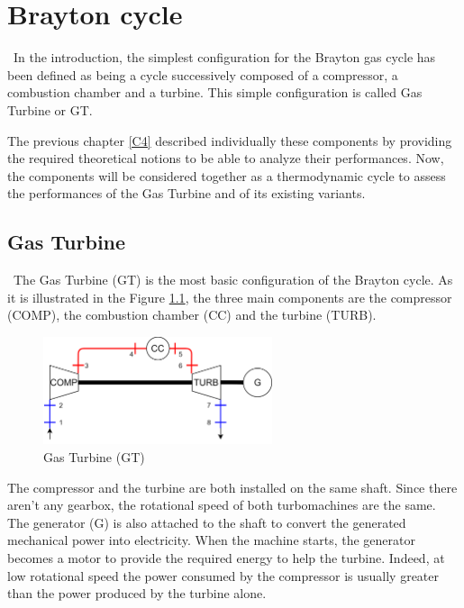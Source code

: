 \graphicspath{{Chapitre_5/Images/}}
\chapter{Brayton cycle}\label{C5}
\quad\, In the introduction, the simplest configuration for the Brayton gas cycle has been defined as being a cycle successively composed of a compressor, a combustion chamber and a turbine. This simple configuration is called Gas Turbine or GT. 

The previous chapter \ref{C4} described individually these components by providing the required theoretical notions to be able to analyze their performances. Now, the components will be considered together as a thermodynamic cycle to assess the performances of the Gas Turbine and of its existing variants.

\section{Gas Turbine}
\quad\, The Gas Turbine (GT) is the most basic configuration of the Brayton cycle. As it is illustrated in the Figure \ref{fig:C5_BraytonGT}, the three main components are the compressor (COMP), the combustion chamber (CC) and the turbine (TURB).

\begin{figure}[h]
\centering
\includegraphics[width=0.6\textwidth] {GT}
\caption{Gas Turbine (GT)}
\label{fig:C5_BraytonGT}
\end{figure}

The compressor and the turbine are both installed on the same shaft. Since there aren't any gearbox, the rotational speed of both turbomachines are the same. The generator (G) is also attached to the shaft to convert the generated mechanical power into electricity. 
When the machine starts, the generator becomes a motor to provide the required energy to help the turbine. Indeed, at low rotational speed the power consumed by the compressor is usually greater than the power produced by the turbine alone. 



